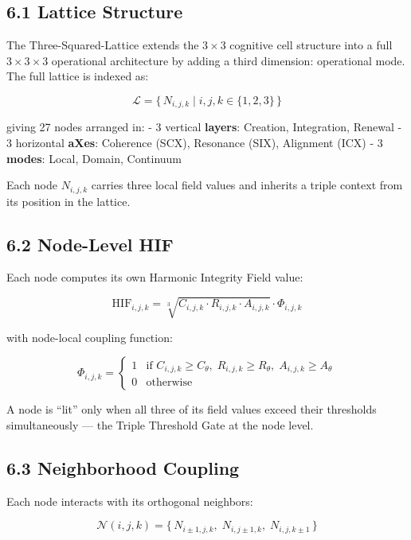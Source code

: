 \subsection{6.1 Lattice Structure}\label{lattice-structure}

The Three-Squared-Lattice extends the \(3 \times 3\) cognitive cell structure into a full \(3 \times 3 \times 3\) operational architecture by adding a third dimension: operational mode. The full lattice is indexed as:

\[
\mathcal{L} = \{\, N_{i,j,k} \mid i,j,k \in \{1,2,3\} \,\}
\]

giving 27 nodes arranged in: - 3 vertical \textbf{layers}: Creation, Integration, Renewal - 3 horizontal \textbf{aXes}: Coherence (SCX), Resonance (SIX), Alignment (ICX) - 3 \textbf{modes}: Local, Domain, Continuum

Each node \(N_{i,j,k}\) carries three local field values and inherits a triple context from its position in the lattice.

\subsection{6.2 Node-Level HIF}\label{node-level-hif}

Each node computes its own Harmonic Integrity Field value:

\[
\mathrm{HIF}_{i,j,k} = \sqrt[3]{C_{i,j,k} \cdot R_{i,j,k} \cdot A_{i,j,k}}
\cdot \Phi_{i,j,k}
\]

with node-local coupling function:

\[
\Phi_{i,j,k} =
\begin{cases}
1 & \text{if } C_{i,j,k} \ge C_{\theta},\; R_{i,j,k} \ge R_{\theta},\;
A_{i,j,k} \ge A_{\theta} \\
0 & \text{otherwise}
\end{cases}
\]

A node is ``lit'' only when all three of its field values exceed their thresholds simultaneously --- the Triple Threshold Gate at the node level.

\subsection{6.3 Neighborhood Coupling}\label{neighborhood-coupling}

Each node interacts with its orthogonal neighbors:

\[
\mathcal{N}(i,j,k) = \{\, N_{i\pm1,j,k},\; N_{i,j\pm1,k},\; N_{i,j,k\pm1} \,\}
\]

